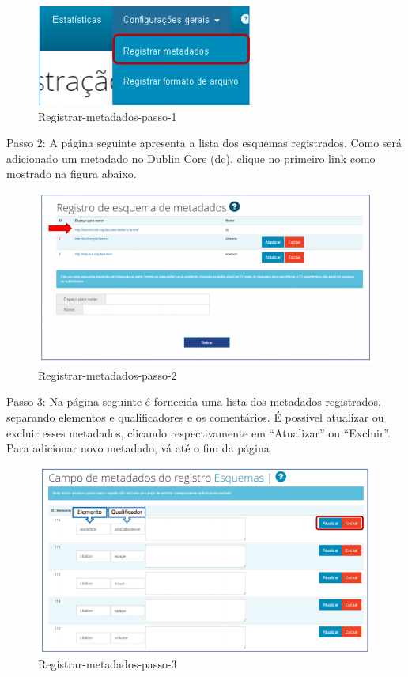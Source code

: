 \documentclass[12pt,hidelinks]{article}
\begin{document}
        \begin{figure}[!htp]
                \centering
                \includegraphics[scale=0.9]{figura/registrar-metadados-passo1.png}
                \caption{Registrar-metadados-passo-1}
            \label{Rotulo}
        \end{figure}

Passo 2: A página seguinte apresenta a lista dos esquemas registrados. Como será adicionado um metadado no Dublin Core (dc), clique no primeiro link como mostrado na figura abaixo.

         \begin{figure}[!htp]
                \centering
                \includegraphics[scale=0.9]{figura/registrar-metadados-passo2.png}
                \caption{Registrar-metadados-passo-2}
            \label{Rotulo}
        \end{figure}
\newpage
Passo 3: Na página seguinte é fornecida uma lista dos metadados registrados, separando elementos e qualificadores e os comentários. É possível atualizar ou excluir esses metadados, clicando respectivamente em “Atualizar” ou “Excluir”. Para adicionar novo metadado, vá até o fim da página
        \begin{figure}[!htp]
                \centering
                \includegraphics[scale=0.9]{figura/registrar-metadados-passo3.png}
                \caption{Registrar-metadados-passo-3}
            \label{Rotulo}
        \end{figure}
\end{document}
